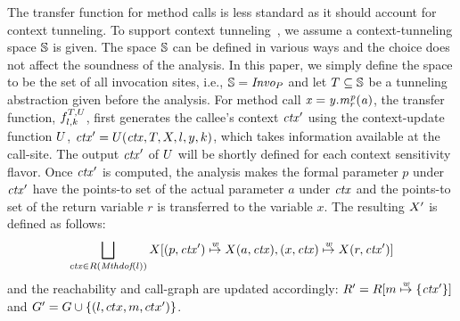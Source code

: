 The transfer function for method calls is less standard as it should 
account for context tunneling. 
To support context tunneling~\cite{JeJeOh18}, we assume a context-tunneling space $\mathbb{S}$ is given. 
The space $\mathbb{S}$ can be defined in various ways and the choice does not affect the soundness of the analysis. 
In this paper, we simply define the space to be the set of all invocation sites, i.e., $\mathbb{S} = \text{\it Invo}_P$ and let $T \subseteq \mathbb{S}$ be a tunneling abstraction given before the analysis. 
For method call ${\it x =
y.m^p_r(a)}$, 
the transfer function, $f^{T, U}_{l, k}$,  first generates the callee's context ${\it ctx}'$ using the context-update function $U$, ${\it ctx}' = U({\it ctx}, T, X, l, y, k)$, which takes information available at the
call-site. 
The output ${\it ctx}'$ of $U$ will be shortly defined for each context sensitivity flavor.
Once ${\it ctx}'$ is computed, the analysis makes the formal
parameter $p$ under ${\it ctx}'$ have the points-to set of the actual
parameter $a$ under ${\it ctx}$ and the points-to set of the return variable
$r$ is transferred to the variable
$x$. The resulting $X'$ is
defined as follows: 
\[
 \bigsqcup_{{\it ctx} \in R(\text{\it Mthdof}(l))}
  	X[	(p,{\it ctx}')
	\stackrel {{\it w}}{\mapsto} X(a, {\it ctx}), 
	(x, {\it ctx}) \stackrel {{\it w}}{\mapsto} X(r,
	{\it ctx}')]
\]
     and the reachability and call-graph are updated accordingly:
      $R' = R[ m \stackrel {{\it w}}{\mapsto} \{ {\it ctx}' \}]$ and $G' = G \cup\{(l,ctx,m,ctx')\}$.




